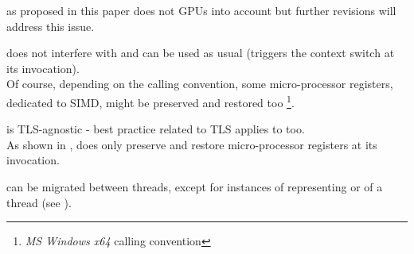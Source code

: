 

\cc as proposed in this paper does not GPUs into account but further revisions
will address this issue.



does not interfere with \cc and can be used as usual (\cc triggers the context
switch at its invocation).\\
Of course, depending on the calling convention, some micro-processor registers,
dedicated to SIMD, might be preserved and restored too
\footnote{\emph{MS Windows x64} calling convention}.



\cc is TLS-agnostic - best practice related to TLS applies to \cc too.\\
As shown in , \cc does only  preserve and restore
micro-processor registers at its invocation.



\cont can be migrated between threads, except for instances of
\cont representing \main or \entryfn of a thread (see ).
